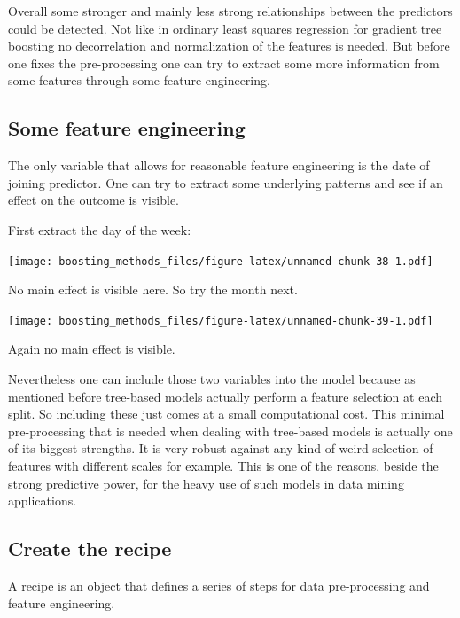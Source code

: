 \documentclass[
]{book}
\begin{document}
Overall some stronger and mainly less strong relationships between the predictors could be detected. Not like in ordinary least squares regression for gradient tree boosting no decorrelation and normalization of the features is needed. But before one fixes the pre-processing one can try to extract some more information from some features through some feature engineering.

\hypertarget{some-feature-engineering}{%
\subsection{Some feature engineering}\label{some-feature-engineering}}

The only variable that allows for reasonable feature engineering is the date of joining predictor. One can try to extract some underlying patterns and see if an effect on the outcome is visible.

First extract the day of the week:

\texttt{[image: boosting\_methods\_files/figure-latex/unnamed-chunk-38-1.pdf]}

No main effect is visible here. So try the month next.

\texttt{[image: boosting\_methods\_files/figure-latex/unnamed-chunk-39-1.pdf]}

Again no main effect is visible.

Nevertheless one can include those two variables into the model because as mentioned before tree-based models actually perform a feature selection at each split. So including these just comes at a small computational cost. This minimal pre-processing that is needed when dealing with tree-based models is actually one of its biggest strengths. It is very robust against any kind of weird selection of features with different scales for example. This is one of the reasons, beside the strong predictive power, for the heavy use of such models in data mining applications.\citep{elements}

\hypertarget{create-the-recipe}{%
\subsection{Create the recipe}\label{create-the-recipe}}

A recipe is an object that defines a series of steps for data pre-processing and feature engineering.
\end{document}
